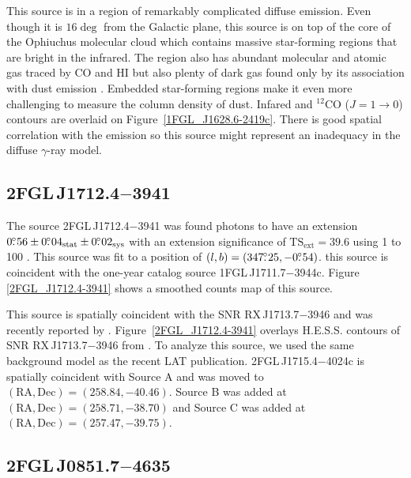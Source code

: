 \documentclass[12pt,preprint]{aastex}
\newcommand{\gev}{\text{GeV}\xspace}
\newcommand{\tev}{\text{TeV}\xspace}
\newcommand{\tsext}{{\ensuremath{\text{TS}_{\text{ext}}}}\xspace}
\newcommand{\sys}{\text{sys}\xspace}
\newcommand{\stat}{\text{stat}\xspace}
\newcommand{\hl}[1]{#1}
\begin{document}
\hl{
This source is in a region of remarkably complicated diffuse emission.
Even though it is $16\deg$ from the Galactic plane, this source is on
top of the core of the Ophiuchus molecular cloud which contains massive
star-forming regions that are bright in the infrared.  The region also has
abundant molecular and atomic gas traced by CO and HI but also plenty of
dark gas found only by its association with dust emission
\citep{isabelle_dark_gass}. Embedded star-forming regions make it even
more challenging to measure the column density of dust.  Infared and 
${}^{12}\text{CO}$ ($J=1\rightarrow 0$)
contours are overlaid on Figure~\ref{1FGL_J1628.6-2419c}. There is good
spatial correlation with the \gev emission \citep{iras_rho_ophiuci,co_rho_ophiuci}
so this source might represent an inadequacy in the diffuse
$\gamma$-ray model.
}

\subsection{2FGL\,J1712.4$-$3941}
\label{section_2FGL_J1712.4-3941}


The source 2FGL\,J1712.4$-$3941 was found 
photons to have an extension $0\fdg56\pm0\fdg04_\stat\pm0\fdg02_\sys$
with an extension significance of $\tsext=39.6$
using 1 \gev to 100 \gev.  This source was
fit to a position of $(l,b)=(347\mbox{$.\!\!^\circ$}25,-0\mbox{$.\!\!^\circ$}54)$.  this source
is coincident with the one-year catalog source 1FGL\,J1711.7$-$3944c.
Figure \ref{2FGL_J1712.4-3941} shows a smoothed counts map of this source.

This source is spatially coincident with the SNR RX\,J1713.7$-$3946
and was recently reported by \citep{rx_j1713_lat}.  
Figure~\ref{2FGL_J1712.4-3941} overlays H.E.S.S. \tev contours of SNR 
RX\,J1713.7$-$3946 from \citep{rx_j1713_hess}.  To analyze this source,
we used the same background model as the recent LAT publication.
2FGL\,J1715.4$-$4024c is spatially coincident with Source A and was
moved to $(\text{RA},\text{Dec})=(258.84,-40.46)$. Source B was added
at $(\text{RA},\text{Dec})=(258.71,-38.70)$ and Source C was added at
$(\text{RA},\text{Dec})=(257.47,-39.75)$.

\subsection{2FGL\,J0851.7$-$4635}
\label{section_2FGL_J0851.7-4635}
\end{document}

